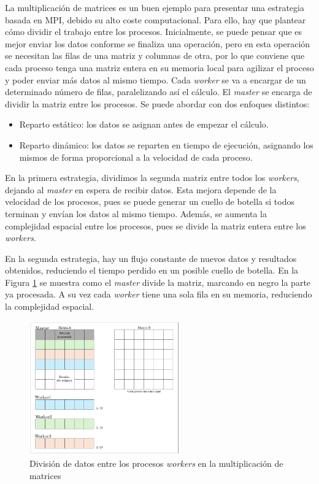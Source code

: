 	La multiplicación de matrices es un buen ejemplo para presentar una estrategia basada en MPI, debido su alto coste computacional. Para ello, hay que plantear cómo dividir el trabajo entre los procesos. Inicialmente, se puede pensar que es mejor enviar los datos conforme se finaliza una operación, pero en esta operación se necesitan las filas de una matriz y columnas de otra, por lo que conviene que cada proceso tenga una matriz entera en su memoria local para agilizar el proceso y poder enviar más datos al mismo tiempo. Cada \textit{worker} se va a encargar de un determinado número de filas, paralelizando así el cálculo. El \textit{master} se encarga de dividir la matriz entre los procesos. Se puede abordar con dos enfoques distintos:
	\begin{itemize}
		\item Reparto estático: los datos se asignan antes de empezar el cálculo. 
		\item Reparto dinámico: los datos se reparten en tiempo de ejecución, asignando los mismos de forma proporcional a la velocidad de cada proceso.
	\end{itemize}



	
	
	En la primera estrategia, dividimos la segunda matriz entre todos los \textit{workers}, dejando al \textit{master} en espera de recibir datos. Esta mejora depende de la velocidad de los procesos, pues se puede generar un cuello de botella si todos terminan y envían los datos al mismo tiempo. Además, se aumenta la complejidad espacial entre los procesos, pues se divide la matriz entera entre los \textit{workers}. 
	
	En la segunda estrategia, hay un flujo constante de nuevos datos y resultados obtenidos, reduciendo el tiempo perdido en un posible cuello de botella. En la Figura \ref{fig:matrizmpi} se muestra como el \textit{master} divide la matriz, marcando en negro la parte ya procesada. A su vez cada \textit{worker} tiene una sola fila en su memoria, reduciendo la complejidad espacial.
	
	\begin{figure}[!h]
	 	\centering
	 	\includegraphics[width=0.58\textwidth]{images/chapter_3/matriz_mpi}
	 	\caption{División de datos entre los procesos \textit{workers} en la multiplicación de matrices}
	 	\label{fig:matrizmpi}
	\end{figure}


